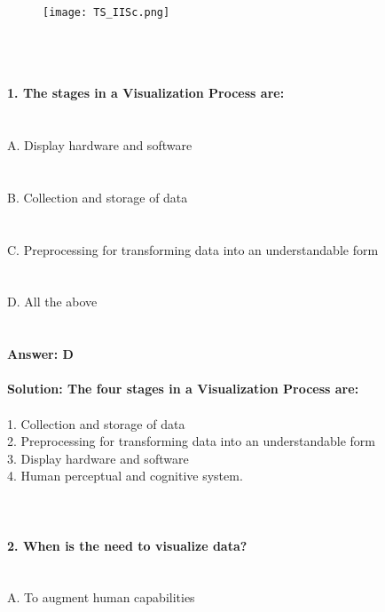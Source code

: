 \documentclass[prl,twocolumn,showpacs,preprintnumbers,superscriptaddress]{revtex4}
\theoremstyle{plain}
\theoremstyle{definition}
\begin{document}
\begin{widetext}
\\
\\
\\

\begin{wrapfigure}
\centering
\end{wrapfigure}
\begin{figure}[h!]
 \begin{right}
  \hfill\texttt{[image: TS\_IISc.png]}
 \end{right}
\end{figure}
\\
\\
\\
\noindent\textbf{1. The stages in a Visualization Process are:}
\\
\\
\\
\noindent A. Display hardware and software
\\
\\
\\
B. Collection and storage of data
\\
\\
\\
C. Preprocessing for transforming data into an understandable form
\\
\\
\\
D. All the above
\\
\\
\\
\textbf{Answer: D}
\\
\\
\textbf{Solution: The four stages in a Visualization Process are:}
\\
\\
1. Collection and storage of data
\\
2. Preprocessing for transforming data into an understandable form
\\
3. Display hardware and software
\\
4. Human perceptual and cognitive 
system.
\\
\\
\\
\\
\textbf{2. When is the need to visualize data?}
\\
\\
\\
\noindent A. To augment human capabilities\\

\end{widetext}
\end{document}
